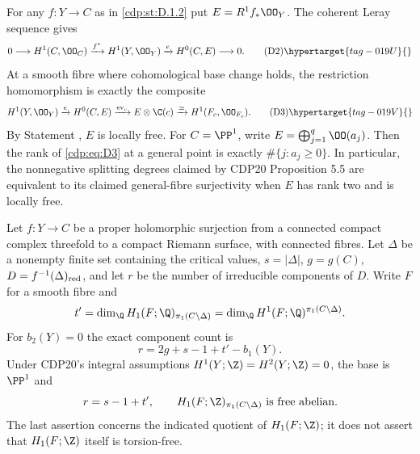 
\begin{proposition}\hypertarget{tag-01G2}{}\label{cdp:st:D.1.4}


For any $f:Y\to C$ as in \ref{cdp:st:D.1.2} put $E=R^1f_*\OO_Y$.
The coherent Leray sequence gives
\[
0\longrightarrow H^1(C,\OO_C)\xrightarrow{f^*}H^1(Y,\OO_Y)
\xrightarrow{e}H^0(C,E)\longrightarrow0.               \tag{D2}\hypertarget{tag-019U}{}\label{cdp:eq:D2}
\]
At a smooth fibre where cohomological base change holds, the
restriction homomorphism is exactly the composite
\[
H^1(Y,\OO_Y)\xrightarrow{e}H^0(C,E)
\xrightarrow{\operatorname{ev}_c}E\otimes\C(c)
\xrightarrow{\simeq}H^1(F_c,\OO_{F_c}).               \tag{D3}\hypertarget{tag-019V}{}\label{cdp:eq:D3}
\]
By Statement , $E$ is locally free. For $C=\PP^1$, write
$E=\bigoplus_{j=1}^q\OO(a_j)$.
Then the rank of \eqref{cdp:eq:D3} at a general point is exactly
$\#\{j:a_j\geq0\}$. In particular, the nonnegative splitting
degrees claimed by CDP20 Proposition 5.5 are equivalent to its
claimed general-fibre surjectivity when $E$ has rank two and is
locally free.
\end{proposition}

\begin{proposition}\hypertarget{tag-01G0}{}\label{cdp:st:D.1.2}


Let $f:Y\to C$ be a proper holomorphic surjection from a connected
compact complex threefold to a compact Riemann surface, with
connected fibres. Let $\Delta$ be a nonempty finite set containing
the critical values, $s=|\Delta|$, $g=g(C)$,
$D=f^{-1}(\Delta)_{\rm red}$, and let $r$ be the number of
irreducible components of $D$. Write $F$ for a smooth fibre and
\[
t'=\dim_{\Q}H_1(F;\Q)_{\pi_1(C\setminus\Delta)}
   =\dim_{\Q}H^1(F;\Q)^{\pi_1(C\setminus\Delta)}.
\]
For $b_2(Y)=0$ the exact component count is
\[
\boxed{\quad r=2g+s-1+t'-b_1(Y).\quad}
\]
Under CDP20's integral assumptions
$H^1(Y;\Z)=H^2(Y;\Z)=0$, the base is $\PP^1$ and
\[
r=s-1+t',\qquad
H_1(F;\Z)_{\pi_1(C\setminus\Delta)}\text{ is free abelian}.
\]
The last assertion concerns the indicated quotient of $H_1(F;\Z)$;
it does not assert that $H_1(F;\Z)$ itself is torsion-free.
\end{proposition}

